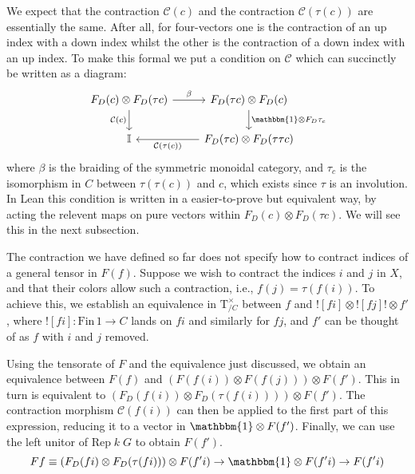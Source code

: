 \documentclass[a4paper, 11pt]{article}
\newcommand{\Rep}[2]{\mathrm{Rep} \; #1 \; #2}
\begin{document}
We expect that the contraction  $\mathcal{C}(c)$ and the contraction $\mathcal{C}(\tau(c))$ are 
essentially the same. After all, for four-vectors one is the contraction of an up index with a down index 
whilst the other is the contraction of a down index with an up index. 
To make this formal we put a condition on $\mathcal{C}$ which can 
succinctly be written as a diagram: 
\begin{equation}
\begin{tikzcd}
  F_D(c) \otimes F_D(\tau c) \arrow[r, "{\beta}"] \arrow[d, "{\mathcal{C}(c)}", swap] & F_D(\tau c) \otimes F_D (c) \arrow[d, "\mathbbm{1} \otimes F_D \tau_c"] \\
  \mathbb{I} & F_D(\tau c) \otimes F_D (\tau \tau c) \arrow[l, "{\mathcal{C}(\tau(c))}", ] 
\end{tikzcd}
\end{equation}
where $\beta$ is the braiding of the symmetric monoidal category, and $\tau_c$ is the isomorphism
in $C$ between $\tau(\tau(c))$ and $c$, which exists since $\tau$ is an involution.
In Lean this condition is written in a easier-to-prove but equivalent way, by acting the relevent maps 
on pure vectors within $F_D(c) \otimes F_D(\tau c)$. We will see this in the next subsection.

The contraction we have defined so far does not specify how to contract indices of a general tensor 
in $F(f)$. Suppose we wish to contract the indices $i$ and $j$ in $X$, and that their 
colors allow such a contraction, i.e., $f(j) = \tau (f (i))$.
To achieve this, we establish an equivalence in $\mathrm{T}_{/C}^\times$ between $f$ and
$![f i]\otimes ![f j]! \otimes f'$, where $![f i] : \mathrm{Fin}\, 1 \to C$ lands on $f i$ and
similarly for $f j$, and $f'$ can be thought of as $f$ with $i$ and $j$ removed.

Using the tensorate of $F$ and the equivalence just discussed, we obtain an equivalence 
between $F(f)$ and $(F(f(i)) \otimes F(f (j))) \otimes F(f')$.
This in turn is equivalent to $(F_D (f (i)) \otimes F_D (\tau (f (i)))) \otimes F(f')$.
The contraction morphism $\mathcal{C}(f(i))$ can then be applied to the first part of this expression,
reducing it to a vector in $\mathbbm{1} \otimes F(f')$. 
Finally, we can use the left unitor of $\Rep{k}{G}$ to obtain $F(f')$.
\begin{equation}
  F f \equiv (F_D (f i) \otimes F_D(\tau (f i)))\otimes F (f' i) \to \mathbbm{1} \otimes F (f' i) \to F (f' i)
\end{equation}
\end{document}
